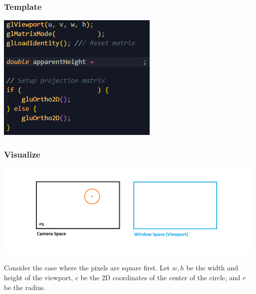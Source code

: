 \documentclass{beamer}
\begin{document}
\begin{frame}
    \frametitle{Template}

    \begin{center}
        \includegraphics[scale=1.4]{q7.png}
    \end{center}

\end{frame}

\begin{frame}
    \frametitle{Visualize}

    \begin{center}
        \includegraphics[scale=0.4]{q7-cam-win.png}
    \end{center}

    \begin{tcolorbox}
        Consider the case where the pixels are square first.
        Let $w, h$ be the width and height of the viewport, 
        $c$ be the 2D coordinates of the center of the circle,
        and $r$ be the radius.
    \end{tcolorbox}

\end{frame}
\end{document}
